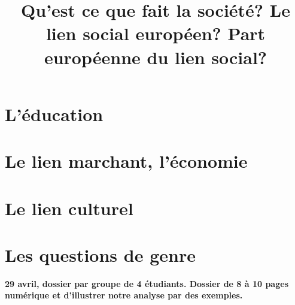 \documentclass[12pt,a4paper]{report}
\begin{document}
\title{Qu'est ce que fait la société? Le lien social européen? Part européenne du lien social? } 
\maketitle

\tableofcontents








\chapter{L'éducation}
\chapter{Le lien marchant, l'économie}
\chapter{Le lien culturel}
\chapter{Les questions de genre}

\textbf{29 avril, dossier par groupe de 4 étudiants.
Dossier de 8 à 10 pages numérique et d'illustrer notre analyse par des exemples.}
\end{document}

